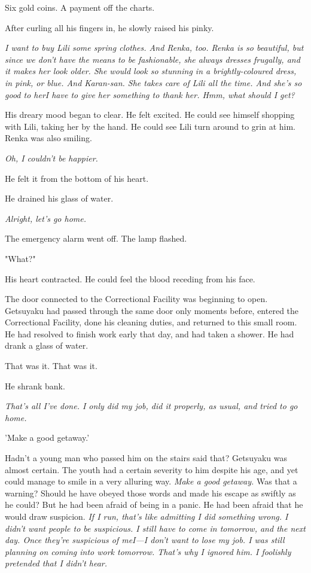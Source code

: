 Six gold coins. A payment off the charts.

After curling all his fingers in, he slowly raised his pinky.

\emph{I want to buy Lili some spring clothes. And Renka, too. Renka is so
beautiful, but since we don't have the means to be fashionable, she
always dresses frugally, and it makes her look older. She would look so
stunning in a brightly-coloured dress, in pink, or blue. And Karan-san.
She takes care of Lili all the time. And she's so good to her\el I have
to give her something to thank her. Hmm, what should I get?}

His dreary mood began to clear. He felt excited. He could see himself
shopping with Lili, taking her by the hand. He could see Lili turn
around to grin at him. Renka was also smiling.

\emph{Oh, I couldn't be happier.}

He felt it from the bottom of his heart.

He drained his glass of water.

\emph{Alright, let's go home.}

The emergency alarm went off. The lamp flashed.

"What?"

His heart contracted. He could feel the blood receding from his face.

The door connected to the Correctional Facility was beginning to open.
Getsuyaku had passed through the same door only moments before, entered
the Correctional Facility, done his cleaning duties, and returned to
this small room. He had resolved to finish work early that day, and had
taken a shower. He had drank a glass of water.

That was it. That was it.

He shrank bank.

\emph{That's all I've done. I only did my job, did it properly, as usual, and
tried to go home.}

'Make a good getaway.'

Hadn't a young man who passed him on the stairs said that? Getsuyaku was
almost certain. The youth had a certain severity to him despite his age,
and yet could manage to smile in a very alluring way. \emph{Make a good
getaway.} Was that a warning? Should he have obeyed those words and made
his escape as swiftly as he could? But he had been afraid of being in a
panic. He had been afraid that he would draw suspicion. \emph{If I run, that's
like admitting I did something wrong. I didn't want people to be
suspicious. I still have to come in tomorrow, and the next day. Once
they're suspicious of me\el I---I don't want to lose my job. I was still
planning on coming into work tomorrow. That's why I ignored him. I
foolishly pretended that I didn't hear.}

